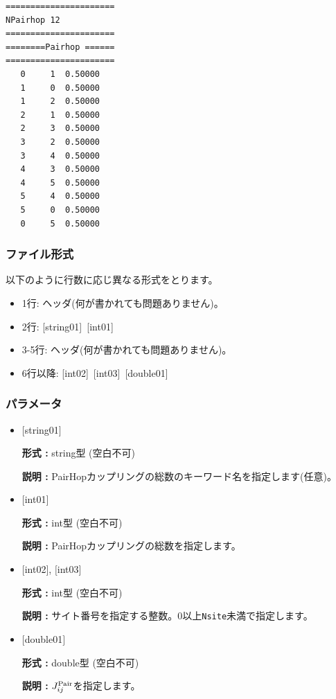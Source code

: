 \begin{minipage}{12.5cm}
\begin{screen}
\begin{verbatim}
====================== 
NPairhop 12  
====================== 
========Pairhop ====== 
====================== 
   0     1  0.50000
   1     0  0.50000  
   1     2  0.50000
   2     1  0.50000
   2     3  0.50000
   3     2  0.50000
   3     4  0.50000
   4     3  0.50000
   4     5  0.50000
   5     4  0.50000
   5     0  0.50000
   0     5  0.50000
\end{verbatim}
\end{screen}
\end{minipage}

\subsubsection{ファイル形式}
以下のように行数に応じ異なる形式をとります。
 \begin{itemize}
   \item  1行:  ヘッダ(何が書かれても問題ありません)。
   \item  2行:   [string01]~[int01]
   \item  3-5行:  ヘッダ(何が書かれても問題ありません)。
   \item  6行以降:
   [int02]~[int03]~[double01] 
  \end{itemize}
\subsubsection{パラメータ}
 \begin{itemize}

   \item  $[$string01$]$
   
    {\bf 形式 :} string型 (空白不可)

   {\bf 説明 :} PairHopカップリングの総数のキーワード名を指定します(任意)。

   \item  $[$int01$]$
   
    {\bf 形式 :} int型 (空白不可)

   {\bf 説明 :} PairHopカップリングの総数を指定します。

  \item  $[$int02$]$, $[$int03$]$
  
 {\bf 形式 :} int型 (空白不可)

{\bf 説明 :} サイト番号を指定する整数。0以上\verb|Nsite|{未満}で指定します。
 
 \item  $[$double01$]$
   
   {\bf 形式 :} double型 (空白不可)

  {\bf 説明 :}  $J_{ij}^{\rm Pair}$を指定します。
  
\end{itemize}

